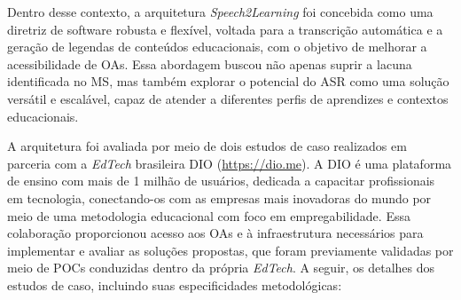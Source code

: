 Dentro desse contexto, a arquitetura \textit{Speech2Learning} foi concebida como uma diretriz de software robusta e flexível, voltada para a transcrição automática e a geração de legendas de conteúdos educacionais, com o objetivo de melhorar a acessibilidade de OAs. Essa abordagem buscou não apenas suprir a lacuna identificada no MS, mas também explorar o potencial do ASR como uma solução versátil e escalável, capaz de atender a diferentes perfis de aprendizes e contextos educacionais.

A arquitetura foi avaliada por meio de dois estudos de caso realizados em parceria com a \textit{EdTech} brasileira DIO (\url{https://dio.me}). A DIO é uma plataforma de ensino com mais de 1 milhão de usuários, dedicada a capacitar profissionais em tecnologia, conectando-os com as empresas mais inovadoras do mundo por meio de uma metodologia educacional com foco em empregabilidade. Essa colaboração proporcionou acesso aos OAs e à infraestrutura necessários para implementar e avaliar as soluções propostas, que foram previamente validadas por meio de POCs conduzidas dentro da própria \textit{EdTech}. A seguir, os detalhes dos estudos de caso, incluindo suas especificidades metodológicas:

